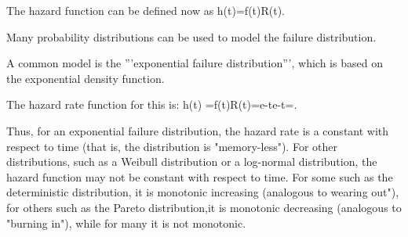 The hazard function can be defined now as  h(t)=f(t)R(t).
 
Many probability distributions can be used to model the failure distribution.
 
A common model is the '''exponential failure distribution''', which is based on the exponential density function.
 
The hazard rate function for this is: h(t) =f(t)R(t)=e-te-t=.
 
Thus, for an exponential failure distribution, the hazard rate is a constant with respect to time (that is, the distribution is "memory-less").  For other distributions, such as a Weibull distribution or a log-normal distribution, the hazard function may not be constant with respect to time. For some such as the deterministic distribution, it is monotonic increasing (analogous to wearing out"), for others such as the Pareto distribution,it is monotonic decreasing (analogous to "burning in"), while for many it is not monotonic.
 

